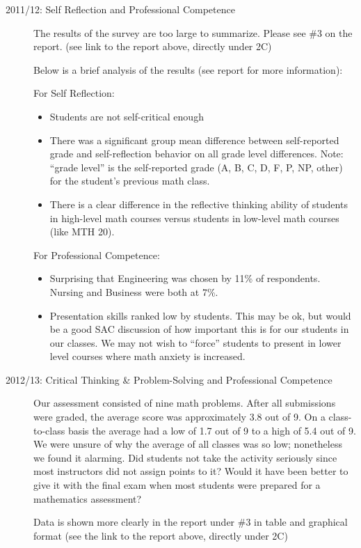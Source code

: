 \begin{description}
\item[2011/12: Self Reflection and Professional Competence]
The results of the survey are too large to summarize.  Please see \#3 on the report.  (see link to the report above, directly under 2C) 

Below is a brief analysis of the results (see report for more information):

For Self Reflection: 
\begin{itemize}
\item Students are not self-critical enough
\item There was a significant group mean difference between self-reported grade and self-reflection behavior on all grade level differences.  Note: ``grade level'' is the self-reported grade (A, B, C, D, F, P, NP, other) for the student's previous math class.
\item There is a clear difference in the reflective thinking ability of students in high-level math courses versus students in low-level math courses (like MTH 20).
\end{itemize}
For Professional Competence:
\begin{itemize}
\item Surprising that Engineering was chosen by 11\% of respondents. Nursing and Business were both at 7\%.\
\item Presentation skills ranked low by students. This may be ok, but would be a good SAC discussion of how important this is for our students in our classes. We may not wish to ``force'' students to present in lower level courses where math anxiety is increased.
\end{itemize}

\item[2012/13:  Critical Thinking \& Problem-Solving and Professional Competence]

Our assessment consisted of nine math problems.  After all submissions were graded, the average score was approximately 3.8 out of 9.  On a class-to-class basis the average had a low of 1.7 out of 9 to a high of 5.4 out of 9.  We were unsure of why the average of all classes was so low; nonetheless we found it alarming.  Did students not take the activity seriously since most instructors did not assign points to it?  Would it have been better to give it with the final exam when most students were prepared for a mathematics assessment? 

Data is shown more clearly in the report under \#3 in table and graphical format (see the link to the report above, directly under 2C)


\end{description}

